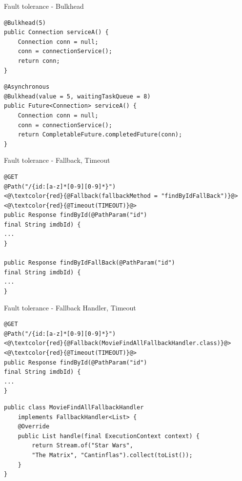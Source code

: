 \documentclass[aspectratio=169]{beamer}
\begin{document}
\begin{frame}[fragile]{Fault tolerance - Bulkhead}
\begin{lstlisting}
@Bulkhead(5)
public Connection serviceA() {
	Connection conn = null;
	conn = connectionService();
	return conn;
}
\end{lstlisting}

\begin{lstlisting}
@Asynchronous
@Bulkhead(value = 5, waitingTaskQueue = 8)
public Future<Connection> serviceA() {
	Connection conn = null;
	conn = connectionService();
	return CompletableFuture.completedFuture(conn);
}

\end{lstlisting}
\end{frame}



\begin{frame}[fragile]{Fault tolerance - Fallback, Timeout}
\begin{lstlisting}
@GET
@Path("/{id:[a-z]*[0-9][0-9]*}")
<@\textcolor{red}{@Fallback(fallbackMethod = "findByIdFallBack")}@>
<@\textcolor{red}{@Timeout(TIMEOUT)}@>
public Response findById(@PathParam("id")
final String imdbId) {
...
}

public Response findByIdFallBack(@PathParam("id")
final String imdbId) {
...
}
\end{lstlisting}
\end{frame}

\begin{frame}[fragile]{Fault tolerance - Fallback Handler, Timeout}
\begin{lstlisting}
@GET
@Path("/{id:[a-z]*[0-9][0-9]*}")
<@\textcolor{red}{@Fallback(MovieFindAllFallbackHandler.class)}@>
<@\textcolor{red}{@Timeout(TIMEOUT)}@>
public Response findById(@PathParam("id")
final String imdbId) {
...
}
\end{lstlisting}
\begin{lstlisting}
public class MovieFindAllFallbackHandler
	implements FallbackHandler<List> {
	@Override
	public List handle(final ExecutionContext context) {
		return Stream.of("Star Wars",
		"The Matrix", "Cantinflas").collect(toList());
	}
}
\end{lstlisting}
\end{frame}
\end{document}
